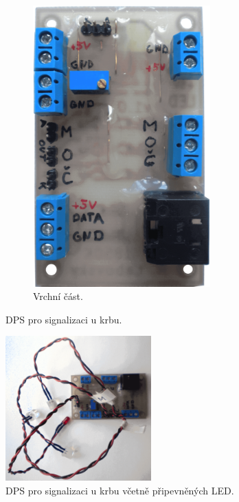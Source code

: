 \begin{figure}[H]
\begin{subfigure}{.5\textwidth}
    \includegraphics[width=0.75\textwidth]{images/krb/dps-led-ochrany-u-krbu-vrsek.png}
    \caption{Vrchní část.}
    \label{fig:dps-led-ochrany-u-krbu-vrsek}
\end{subfigure}
\caption{DPS pro signalizaci u krbu.}
\label{fig:dps-pro-signalizaci-u-krbu}
\end{figure}

\begin{figure}[H]
    \centering
    \includegraphics[width=0.5\textwidth]{images/krb/dps-led-ochrany-u-krbu-kabely.png}
    \caption{DPS pro signalizaci u krbu včetně připevněných LED.}
    \label{fig:dps-led-ochrany-u-krbu-kabely}
\end{figure}

